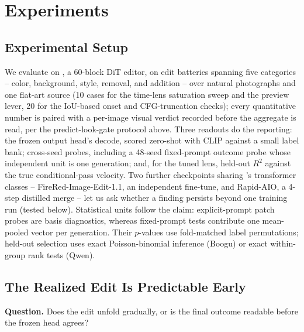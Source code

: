 \section{Experiments}\label{sec:experiments}

\subsection{Experimental Setup}\label{sec:setup}

We evaluate on \model{}, a 60-block DiT editor, on edit batteries
spanning five categories -- color, background, style, removal, and
addition -- over natural photographs and one flat-art source (10 cases
for the time-lens saturation sweep and the preview lever, 20 for the
IoU-based onset and CFG-truncation checks); every quantitative number
is paired with a per-image visual verdict recorded before the
aggregate is read, per the predict-look-gate protocol above. Three
readouts do the reporting: the frozen output head's decode, scored
zero-shot with CLIP against a small label bank; cross-seed probes,
including a 48-seed fixed-prompt outcome probe whose independent unit
is one generation; and, for the tuned lens, held-out $R^2$ against the true
conditional-pass velocity. Two further checkpoints sharing \model{}'s
transformer classes -- FireRed-Image-Edit-1.1, an independent
fine-tune, and Rapid-AIO, a 4-step distilled merge -- let us ask
whether a finding persists beyond one training run
(tested below).
Statistical units follow the claim: explicit-prompt patch probes are basis
diagnostics, whereas fixed-prompt tests contribute one mean-pooled vector per
generation. Their $p$-values use fold-matched label permutations; held-out
selection uses exact Poisson-binomial inference (Boogu) or exact within-group
rank tests (Qwen).

\subsection{The Realized Edit Is Predictable Early}\label{sec:early}

\noindent\textbf{Question.} Does the edit unfold gradually, or is the
final outcome readable before the frozen head agrees?

